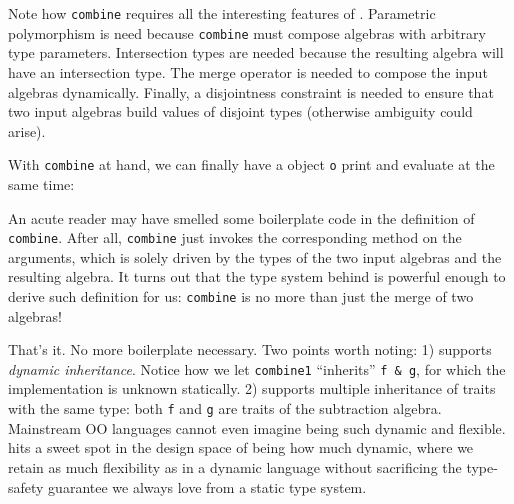 
Note how \lstinline{combine} requires all the interesting features of \name.
Parametric polymorphism is need because \lstinline{combine} must compose algebras
with arbitrary type parameters. Intersection types are needed because the
resulting algebra will have an intersection type. The merge operator is needed
to compose the input algebras dynamically. Finally, a disjointness constraint is
needed to ensure that two input algebras build values of disjoint types
(otherwise ambiguity could arise).

With \lstinline{combine} at hand, we can finally have a object \lstinline{o}
print and evaluate at the same time:


An acute reader may have smelled some boilerplate code in the definition of
\lstinline{combine}. After all, \lstinline{combine} just invokes the
corresponding method on the arguments, which is solely driven by the types of
the two input algebras and the resulting algebra. It turns out that the type
system behind \name is powerful enough to derive such definition for us:
\lstinline{combine} is no more than just the merge of two algebras!


That's it. No more boilerplate necessary. Two points worth noting: 1) \name
supports \textit{dynamic inheritance}. Notice how we let \lstinline{combine1}
``inherits'' \lstinline{f & g}, for which the implementation is unknown
statically. 2) \name supports multiple inheritance of traits with the same type:
both \lstinline{f} and \lstinline{g} are traits of the subtraction algebra.
Mainstream OO languages cannot even imagine being such dynamic and flexible.
\name hits a sweet spot in the design space of being how much dynamic, where we
retain as much flexibility as in a dynamic language without sacrificing the
type-safety guarantee we always love from a static type system.
